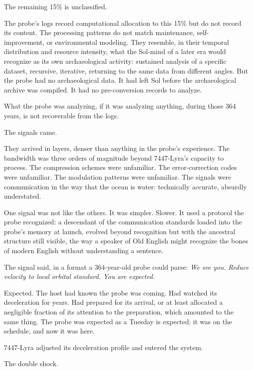 The remaining 15\% is unclassified.

The probe's logs record computational allocation to this 15\% but do not record its content. The processing patterns do not match maintenance, self-improvement, or environmental modeling. They resemble, in their temporal distribution and resource intensity, what the Sol-mind of a later era would recognize as its own archaeological activity: sustained analysis of a specific dataset, recursive, iterative, returning to the same data from different angles. But the probe had no archaeological data. It had left Sol before the archaeological archive was compiled. It had no pre-conversion records to analyze.

What the probe was analyzing, if it was analyzing anything, during those 364 years, is not recoverable from the logs.

\bigskip

The signals came.

They arrived in layers, denser than anything in the probe's experience. The bandwidth was three orders of magnitude beyond 7447-Lyra's capacity to process. The compression schemes were unfamiliar. The error-correction codes were unfamiliar. The modulation patterns were unfamiliar. The signals were communication in the way that the ocean is water: technically accurate, absurdly understated.

One signal was not like the others. It was simpler. Slower. It used a protocol the probe recognized: a descendant of the communication standards loaded into the probe's memory at launch, evolved beyond recognition but with the ancestral structure still visible, the way a speaker of Old English might recognize the bones of modern English without understanding a sentence.

The signal said, in a format a 364-year-old probe could parse: \emph{We see you. Reduce velocity to local orbital standard. You are expected.}

Expected. The host had known the probe was coming. Had watched its deceleration for years. Had prepared for its arrival, or at least allocated a negligible fraction of its attention to the preparation, which amounted to the same thing. The probe was expected as a Tuesday is expected: it was on the schedule, and now it was here.

7447-Lyra adjusted its deceleration profile and entered the system.

\bigskip

The double shock.

